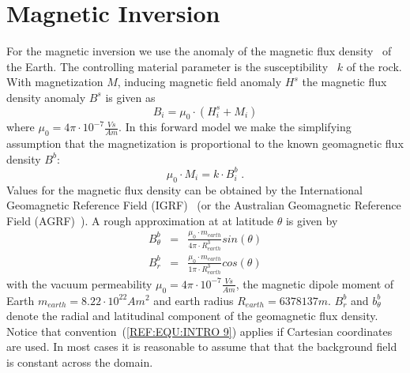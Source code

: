 
%
%
%


\section{Magnetic Inversion}\label{sec:forward magnetic}
For the magnetic inversion we use the anomaly of the magnetic flux density~ of the Earth.
The controlling material parameter
is the susceptibility~ $k$ of the rock. With magnetization $M$,
inducing magnetic field anomaly $H^s$ the magnetic flux density anomaly $B^s$ is given as
\begin{equation}\label{ref:MAG:EQU:1}
B_i = \mu_0 \cdot ( H^s_i  + M_i )
\end{equation}
where $\mu_0 = 4 \pi \cdot 10^{-7} \frac{Vs}{Am}$.
In this forward model we make the simplifying assumption that the magnetization is proportional to
the known geomagnetic
 flux density $B^b$:
\begin{equation}\label{ref:MAG:EQU:4}
\mu_0  \cdot M_i = k \cdot B^b_i \;. 
\end{equation}
Values for the magnetic flux density
can be obtained by the International Geomagnetic Reference Field (IGRF)~\cite{IGRF}
(or the Australian Geomagnetic Reference Field (AGRF)~\cite{AGRF}). A rough approximation at 
at latitude $\theta$ is given by 
\begin{equation}\label{ref:MAG:EQU:5}
\begin{array}{rcl}
B^b_{\theta}  & = & \displaystyle{ \frac{ \mu_0 \cdot m_{earth}}{4 \pi \cdot R_{earth}^3} sin(\theta) }  \\
B^b_r & = & \displaystyle{ \frac{\mu_0 \cdot  m_{earth}}{1 \pi \cdot R_{earth}^3} cos(\theta) }
\end{array}
\end{equation}
with the vacuum permeability  $\mu_0 = 4 \pi \cdot 10^{-7} \frac{Vs}{Am}$, 
the magnetic dipole moment of Earth $m_{earth}= 8.22 \cdot 10^{22} Am^2$ and earth radius $R_{earth}= 6378137m$.
$B^b_r$ and $b^b_{\theta}$ denote the radial and latitudinal component of the geomagnetic
 flux density.
Notice that convention~(\ref{REF:EQU:INTRO 9}) applies if Cartesian coordinates are used. 
In most cases it is reasonable to assume that that the background field is constant across the domain.

